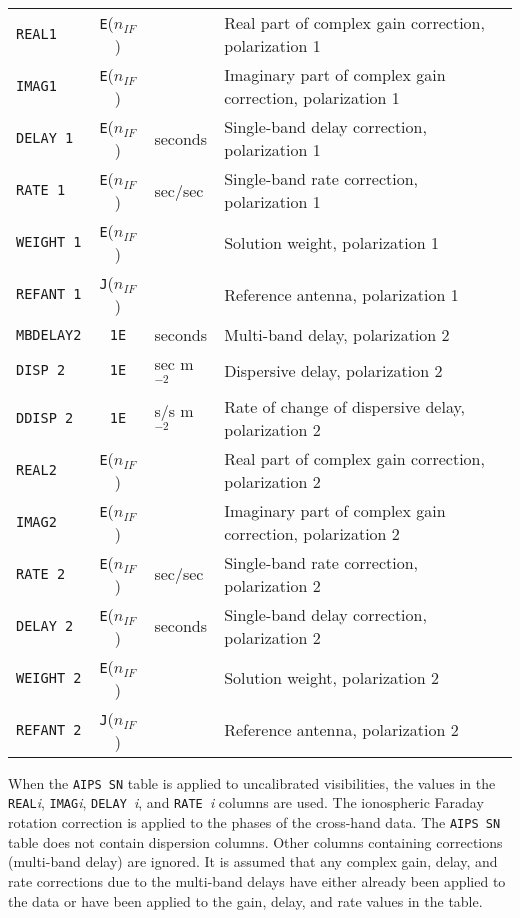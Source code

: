 \documentclass[twoside]{article}
\newcommand{\Hi}[1]{\textcolor{hicol}{#1}}
\newcommand{\nif}{$n_{IF}$}
\begin{document}
\begin{center}
\begin{tabular}{lcll}
{\tt REAL1}         & {\tt E}(\nif) & & Real part of complex gain correction, polarization 1 \\
{\tt IMAG1}         & {\tt E}(\nif) & & Imaginary part of complex gain correction, polarization 1 \\
{\tt DELAY 1}       & {\tt E}(\nif) & seconds & Single-band delay correction, polarization 1 \\
{\tt RATE 1}        & {\tt E}(\nif) & sec/sec & Single-band rate correction, polarization 1 \\
{\tt WEIGHT 1}      & {\tt E}(\nif) & & Solution weight, polarization 1 \\
{\tt REFANT 1}      & {\tt J}(\nif) & & Reference antenna, polarization 1 \\
\hline
{\tt MBDELAY2}      & {\tt 1E} & seconds & Multi-band delay, polarization 2 \\
\Hi{{\tt DISP 2}}   & \Hi{{\tt 1E}} & \Hi{sec m$^{-2}$} & \Hi{Dispersive delay, polarization 2} \\
\Hi{{\tt DDISP 2}}  & \Hi{{\tt 1E}} & \Hi{s/s m$^{-2}$} & \Hi{Rate of change of dispersive delay, polarization 2} \\
{\tt REAL2}         & {\tt E}(\nif) & & Real part of complex gain correction, polarization 2 \\
{\tt IMAG2}         & {\tt E}(\nif) & & Imaginary part of complex gain correction, polarization 2 \\
{\tt RATE 2}        & {\tt E}(\nif) & sec/sec & Single-band rate correction, polarization 2 \\
{\tt DELAY 2}       & {\tt E}(\nif) & seconds & Single-band delay correction, polarization 2 \\
{\tt WEIGHT 2}      & {\tt E}(\nif) & & Solution weight, polarization 2 \\
{\tt REFANT 2}      & {\tt J}(\nif) & & Reference antenna, polarization 2
\end{tabular}
\end{center}

When the {\tt AIPS SN} table is applied to uncalibrated visibilities,
the values in the {\tt REAL}{\it i}, {\tt IMAG}{\it i}, {\tt DELAY\
}{\it i}, and {\tt RATE\ }{\it i} columns are used.  The ionospheric
Faraday rotation correction is applied to the phases of the cross-hand
data.  The {\tt AIPS SN} table does not contain dispersion columns.
Other columns containing corrections (multi-band delay) are ignored.
It is assumed that any complex gain, delay, and rate corrections due
to the multi-band delays have either already been applied to the data
or have been applied to the gain, delay, and rate values in the table.
\end{document}
